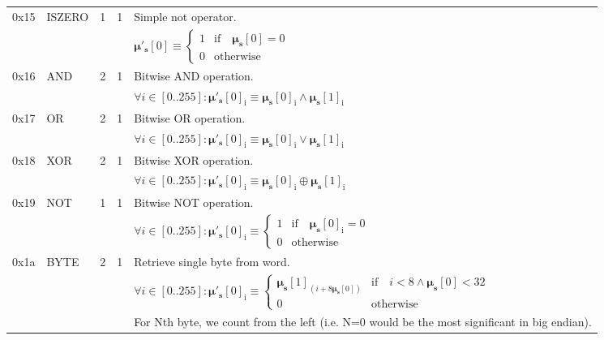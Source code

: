 \documentclass[9pt,oneside]{amsart}
\begin{document}
\begin{tabular*}{\columnwidth}[h]{rlrrl}
\midrule
0x15 & {\small ISZERO} & 1 & 1 & Simple not operator. \\
&&&& $\boldsymbol{\mu}'_{\mathbf{s}}[0] \equiv \begin{cases} 1 & \text{if} \quad \boldsymbol{\mu}_{\mathbf{s}}[0] = 0 \\ 0 & \text{otherwise} \end{cases}$ \\
\midrule
0x16 & {\small AND} & 2 & 1 & Bitwise AND operation. \\
&&&& $\forall i \in [0..255]: \boldsymbol{\mu}'_{\mathbf{s}}[0]_{\mathrm{i}} \equiv \boldsymbol{\mu}_{\mathbf{s}}[0]_{\mathrm{i}} \wedge \boldsymbol{\mu}_{\mathbf{s}}[1]_{\mathrm{i}}$ \\
\midrule
0x17 & {\small OR} & 2 & 1 & Bitwise OR operation. \\
&&&& $\forall i \in [0..255]: \boldsymbol{\mu}'_{\mathbf{s}}[0]_{\mathrm{i}} \equiv \boldsymbol{\mu}_{\mathbf{s}}[0]_{\mathrm{i}} \vee \boldsymbol{\mu}_{\mathbf{s}}[1]_{\mathrm{i}}$ \\
\midrule
0x18 & {\small XOR} & 2 & 1 & Bitwise XOR operation. \\
&&&& $\forall i \in [0..255]: \boldsymbol{\mu}'_{\mathbf{s}}[0]_{\mathrm{i}} \equiv \boldsymbol{\mu}_{\mathbf{s}}[0]_{\mathrm{i}} \oplus \boldsymbol{\mu}_{\mathbf{s}}[1]_{\mathrm{i}}$ \\
\midrule
0x19 & {\small NOT} & 1 & 1 & Bitwise NOT operation. \\
&&&& $\forall i \in [0..255]: \boldsymbol{\mu}'_{\mathbf{s}}[0]_{\mathrm{i}} \equiv \begin{cases} 1 & \text{if} \quad \boldsymbol{\mu}_{\mathbf{s}}[0]_{\mathrm{i}} = 0 \\ 0 & \text{otherwise} \end{cases}$ \\
\midrule
0x1a & {\small BYTE} & 2 & 1 & Retrieve single byte from word. \\
&&&& $\forall i \in [0..255]: \boldsymbol{\mu}'_{\mathbf{s}}[0]_{\mathrm{i}} \equiv \begin{cases} \boldsymbol{\mu}_{\mathbf{s}}[1]_{(i + 8\boldsymbol{\mu}_{\mathbf{s}}[0])} & \text{if} \quad i < 8 \wedge \boldsymbol{\mu}_{\mathbf{s}}[0] < 32 \\ 0 & \text{otherwise} \end{cases} $\\
&&&& For Nth byte, we count from the left (i.e. N=0 would be the most significant in big endian). \\
\bottomrule
\end{tabular*}
\end{document}
